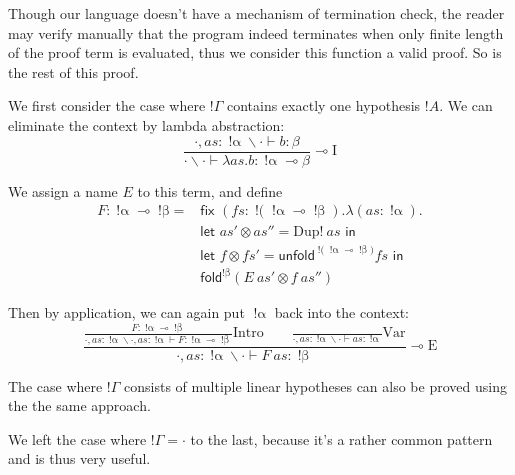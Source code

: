 \documentclass{article}
\newcommand{\bang}[1]{\operatorname{! #1}}
\newcommand{\letin}[2]{\textsf{let } #1 \textsf{ in } #2}
\newcommand{\fold}[2]{\textsf{fold}^{#1} #2}
\newcommand{\unfold}[2]{\textsf{unfold}^{#1} #2}
\begin{document}
Though our language doesn't have a mechanism of termination check, the reader may verify manually that the program indeed terminates when only finite length of the proof term is evaluated, thus we consider this function a valid proof. So is the rest of this proof.

We first consider the case where $!\Gamma$ contains exactly one hypothesis $! A$. We can eliminate the context by lambda abstraction:
\begin{displaymath}
  \frac
    {\cdot, as : \bang \alpha \backslash \cdot \vdash b : \beta}
    {\cdot \backslash \cdot \vdash \lambda as. b : \bang \alpha \multimap \beta}
  \multimap \mathrm{I}
\end{displaymath}

We assign a name $E$ to this term, and define
\begin{align*}
F : \bang \alpha \multimap \bang \beta 
\text{= } & \textsf{fix }(fs : \bang (\bang \alpha \multimap \bang \beta). \lambda (as : \bang \alpha). \\
  & \letin{as' \otimes as'' = \textrm{Dup!} ~ as}{} \\
  & \letin{f \otimes fs' = \unfold{\bang (\bang \alpha \multimap \bang \beta)}{fs}}{} \\
  & \fold{\bang \beta}{(E ~ as' \otimes f ~ as'')}
\end{align*}

Then by application, we can again put $\bang \alpha$ back into the context:
\begin{displaymath}
  \displaystyle \frac
    { \displaystyle \frac
        {F : \bang \alpha \multimap \bang \beta}
        {\cdot, as : \bang \alpha \backslash \cdot, as : \bang \alpha \vdash F : \bang \alpha \multimap \bang \beta}
      \mathrm{Intro}
      \qquad
      \displaystyle \frac
        {}
        {\cdot, as : \bang \alpha \backslash \cdot \vdash as : \bang \alpha}
      \mathrm{Var}
    }
    {\cdot, as : \bang \alpha \backslash \cdot \vdash F ~ as : \bang \beta}
  \multimap \mathrm{E}
\end{displaymath}

The case where $!\Gamma$ consists of multiple linear hypotheses can also be proved using the the same approach.

We left the case where $!\Gamma = \cdot$ to the last, because it's a rather common pattern and is thus very useful.
\end{document}
